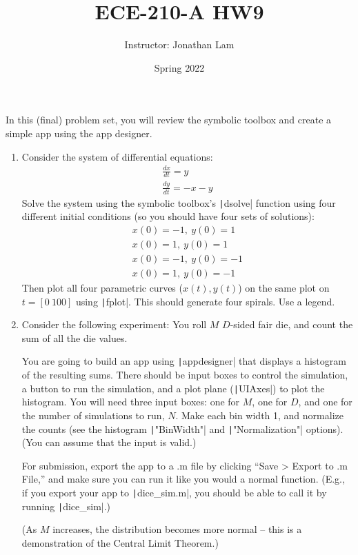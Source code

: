\documentclass{article}
\title{ECE-210-A HW9}
\author{Instructor: Jonathan Lam}
\date{Spring 2022}
\begin{document}
\maketitle

\noindent In this (final) problem set, you will review the symbolic toolbox and create a simple app using the app designer.

\begin{enumerate}
\item Consider the system of differential equations:
  \begin{gather*}
    \frac{dx}{dt}=y\\
    \frac{dy}{dt}=-x-y
  \end{gather*}
  Solve the system using the symbolic toolbox's \texttt|dsolve| function using four different initial conditions (so you should have four sets of solutions):
  \begin{gather*}
    x(0)=-1,\ y(0)=1\\
    x(0)=1,\ y(0)=1\\
    x(0)=-1,\ y(0)=-1\\
    x(0)=1,\ y(0)=-1
  \end{gather*}
  Then plot all four parametric curves ($x(t),y(t)$) on the same plot on $t=[0\ 100]$ using \texttt|fplot|. This should generate four spirals. Use a legend.
  
\item Consider the following experiment: You roll $M$ $D$-sided fair die, and count the sum of all the die values.
  
  You are going to build an app using \texttt|appdesigner| that displays a histogram of the resulting sums. There should be input boxes to control the simulation, a button to run the simulation, and a plot plane (\texttt|UIAxes|) to plot the histogram. You will need three input boxes: one for $M$, one for $D$, and one for the number of simulations to run, $N$. Make each bin width 1, and normalize the counts (see the histogram \texttt|"BinWidth"| and \texttt|"Normalization"| options). (You can assume that the input is valid.)
  
  For submission, export the app to a .m file by clicking ``Save > Export to .m File,'' and make sure you can run it like you would a normal function. (E.g., if you export your app to \texttt|dice_sim.m|, you should be able to call it by running \texttt|dice_sim|.)
  
  (As $M$ increases, the distribution becomes more normal -- this is a demonstration of the Central Limit Theorem.)
\end{enumerate}
\end{document}
